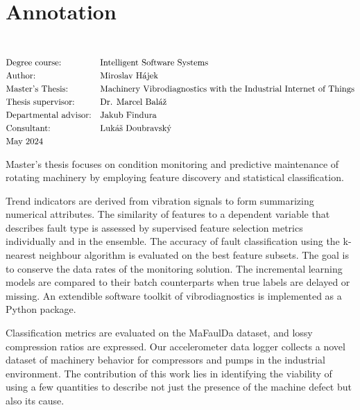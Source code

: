 \thispagestyle{empty}
\section*{Annotation}
\UniversityEN \\
\uppercase{\FacultyEN}
\vspace{-8pt}
{\setlength{\mathindent}{0cm}
\begin{align*}
&\text{Degree course:} && \text{\StudyProgrammeEN} \\
&\text{Author:} && \text{\AuthorEN} \\
&\text{\ThesisEN:} && \text{\TitleEN} \\
&\text{Thesis supervisor:} && \text{\SupervisorEN} \\
&\text{Departmental advisor:} && \text{\DepartmentalAdvisorEN} \\
&\text{Consultant:} && \text{\ConsultantEN} \\
&\text{\DateEN}
\end{align*}}

Master's thesis focuses on condition monitoring and predictive maintenance of rotating machinery by employing feature discovery and statistical classification. 

Trend indicators are derived from vibration signals to form summarizing numerical attributes. The similarity of features to a dependent variable that describes fault type is assessed by supervised feature selection metrics individually and in the ensemble. The accuracy of fault classification using the k-nearest neighbour algorithm is evaluated on the best feature subsets. The goal is to conserve the data rates of the monitoring solution. The incremental learning models are compared to their batch counterparts when true labels are delayed or missing. An extendible software toolkit of vibrodiagnostics is implemented as a Python package.

Classification metrics are evaluated on the MaFaulDa dataset, and lossy compression ratios are expressed. Our accelerometer data logger collects a novel dataset of machinery behavior for compressors and pumps in the industrial environment. The contribution of this work lies in identifying the viability of using a few quantities to describe not just the presence of the machine defect but also its cause.
\emptypage 

\thispagestyle{empty}
